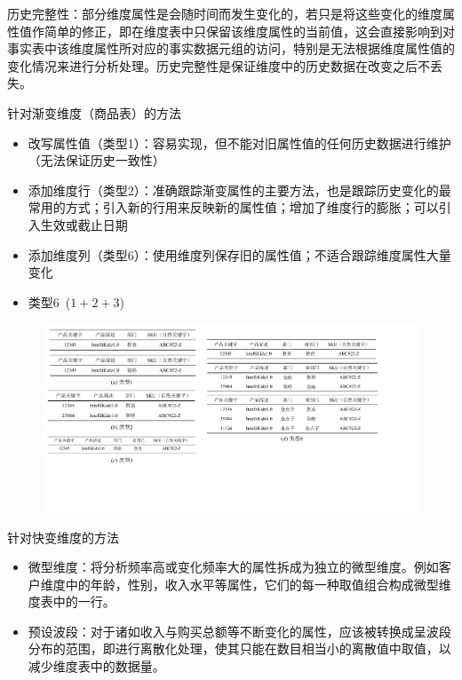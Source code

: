 \begin{solution}
历史完整性：部分维度属性是会随时间而发生变化的，若只是将这些变化的维度属性值作简单的修正，即在维度表中只保留该维度属性的当前值，这会直接影响到对事实表中该维度属性所对应的事实数据元组的访问，特别是无法根据维度属性值的变化情况来进行分析处理。历史完整性是保证维度中的历史数据在改变之后不丢失。

针对渐变维度（商品表）的方法
\begin{itemize}
    \item 改写属性值（类型1）：容易实现，但不能对旧属性值的任何历史数据进行维护（无法保证历史一致性）
    \item 添加维度行（类型2）：准确跟踪渐变属性的主要方法，也是跟踪历史变化的最常用的方式；引入新的行用来反映新的属性值；增加了维度行的膨胀；可以引入生效或截止日期
    \item 添加维度列（类型6）：使用维度列保存旧的属性值；不适合跟踪维度属性大量变化
    \item 类型6\ ($1+2+3$)
\end{itemize}

\begin{figure}[H]
    \centering
    \includegraphics[width=\textwidth]{images/类型1,2,3,6.pdf}
    \vspace{-1em}
\end{figure}

针对快变维度的方法
\begin{itemize}
    \item 微型维度：将分析频率高或变化频率大的属性拆成为独立的微型维度。例如客户维度中的年龄，性别，收入水平等属性，它们的每一种取值组合构成微型维度表中的一行。
    \item 预设波段：对于诸如收入与购买总额等不断变化的属性，应该被转换成呈波段分布的范围，即进行离散化处理，使其只能在数目相当小的离散值中取值，以减少维度表中的数据量。
\end{itemize}

\end{solution}


